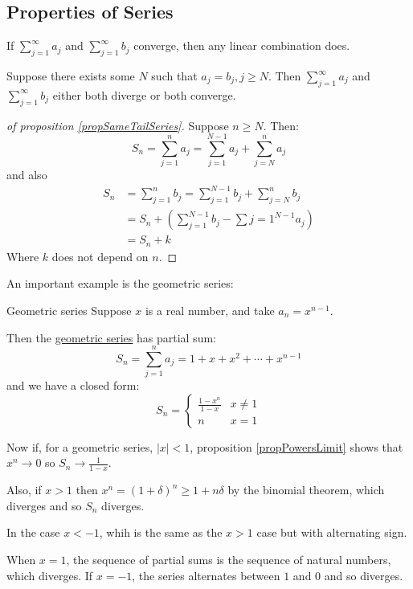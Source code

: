 \documentclass[../Main.tex]{subfiles}
\begin{document}
\subsection{Properties of Series}
\begin{propositions}{
        \label{eqnSeriesProperties}
    }
    \item If $\sum_{j=1}^\infty a_j$ and $\sum_{j=1}^\infty b_j$ converge, then any linear combination does. \label{propSeriesLinearCombo}
    \item Suppose there exists some $N$ such that $a_j = b_j, j \geq N$.
        Then $\sum_{j=1}^\infty a_j$ and $\sum_{j=1}^\infty b_j$ either both diverge or both converge. \label{propSameTailSeries}
\end{propositions}
\begin{proof}[of proposition \ref{propSameTailSeries}]
    Suppose $n \geq N$. Then:
    \begin{equation*}
        S_n = \sum_{j=1}^n a_j = \sum_{j=1}^{N-1}a_j + \sum_{j=N}^{n} a_j
    \end{equation*}
    and also
    \begin{align*}
        S_n &= \sum_{j=1}^n b_j = \sum_{j=1}^{N-1}b_j + \sum_{j=N}^{n} b_j \\
        &= S_n + \left(\sum_{j=1}^{N-1} b_j - \sum{j=1}^{N-1} a_j\right) \\
        &= S_n + k
    \end{align*}
    Where $k$ does not depend on $n$.
\end{proof}
An important example is the geometric series:
\begin{definition}{Geometric series}
    Suppose $x$ is a real number, and take $a_n = x^{n-1}$.\par
    Then the \underline{geometric series} has partial sum:
    \begin{equation*}
        S_n = \sum_{j=1}^n a_j = 1 + x + x^2 + \cdots + x^{n-1}
    \end{equation*}
    and we have a closed form:
    \begin{equation*}
        S_n =
        \begin{cases}
            \frac{1 - x^n}{1 - x} & x \neq 1 \\
            n & x = 1
        \end{cases}
    \end{equation*}
\end{definition}
Now if, for a geometric series, $|x| < 1$, proposition \ref{propPowersLimit} shows that $x^n \to 0$ so $S_n \to \frac{1}{1-x}$.\par
Also, if $x > 1$ then $x^n = (1 + \delta)^n \geq 1 + n\delta$ by the binomial theorem, which diverges and so $S_n$ diverges.\par
In the case $x < -1$, whih is the same as the $x > 1$ case but with alternating sign.\par
When $x = 1$, the sequence of partial sums is the sequence of natural numbers, which diverges. If $x = -1$, the series alternates between $1$ and $0$ and so diverges.
\end{document}
